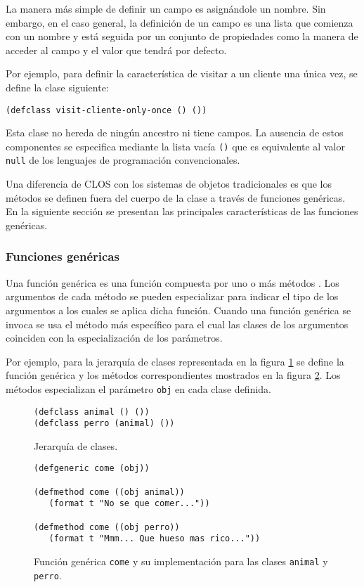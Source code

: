 La manera más simple de definir un campo es asignándole un nombre. Sin embargo, en el caso general, la definición de un campo es una lista que comienza con un nombre y está seguida por un conjunto de propiedades como la manera de acceder al campo y el valor que tendrá por defecto.

Por ejemplo, para definir la característica de visitar a un cliente una única vez, se define la clase siguiente:

\begin{lstlisting}
(defclass visit-cliente-only-once () ())
\end{lstlisting}

Esta clase no hereda de ningún ancestro ni tiene campos. La ausencia de estos componentes se especifica mediante la lista vacía {\tt ()} que es equivalente al valor {\tt null} de los lenguajes de programación convencionales.

Una diferencia de CLOS con los sistemas de objetos tradicionales es que los métodos se definen fuera del cuerpo de la clase a través de funciones genéricas. En la siguiente sección se presentan las principales características de las funciones genéricas.

\subsubsection{Funciones genéricas}\label{subsubsec:genericFunction}
Una función genérica es una función compuesta por uno o más métodos \cite{graham@ansiCL}. Los argumentos de cada método se pueden especializar para indicar el tipo de los argumentos a los cuales se aplica dicha función. Cuando una función genérica se invoca se usa el método más específico para el cual las clases de los argumentos coinciden con la especialización de los parámetros.

Por ejemplo, para la jerarquía de clases representada en la figura \ref{fig:fgClass} se define la función genérica y los métodos correspondientes mostrados en la figura \ref{fig:fgMethods}. Los métodos especializan el parámetro {\tt obj} en cada clase definida.

\begin{figure}[h!]
\begin{lstlisting}
(defclass animal () ())
(defclass perro (animal) ())
\end{lstlisting}
	\caption{Jerarquía de clases.}  \label{fig:fgClass}
\end{figure}

\begin{figure}[h!]
\begin{lstlisting}
(defgeneric come (obj))

(defmethod come ((obj animal))
   (format t "No se que comer..."))
 
(defmethod come ((obj perro))
   (format t "Mmm... Que hueso mas rico..."))
\end{lstlisting}
	\caption{Función genérica {\tt come} y su implementación para las clases {\tt animal} y {\tt perro}.}  \label{fig:fgMethods}
\end{figure}

